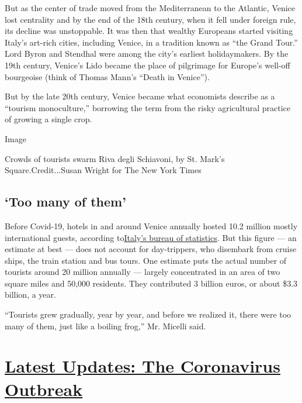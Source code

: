 But as the center of trade moved from the Mediterranean to the Atlantic,
Venice lost centrality and by the end of the 18th century, when it fell
under foreign rule, its decline was unstoppable. It was then that
wealthy Europeans started visiting Italy's art-rich cities, including
Venice, in a tradition known as ``the Grand Tour.'' Lord Byron and
Stendhal were among the city's earliest holidaymakers. By the 19th
century, Venice's Lido became the place of pilgrimage for Europe's
well-off bourgeoise (think of Thomas Mann's ``Death in Venice'').

But by the late 20th century, Venice became what economists describe as
a ``tourism monoculture,'' borrowing the term from the risky
agricultural practice of growing a single crop.

Image

Crowds of tourists swarm Riva degli Schiavoni, by St. Mark's
Square.Credit...Susan Wright for The New York Times

\hypertarget{too-many-of-them}{%
\subsection{`Too many of them'}\label{too-many-of-them}}

Before Covid-19, hotels in and around Venice annually hosted 10.2
million mostly international guests, according
to\href{https://www.istat.it/it/files/2019/11/Movimento-turistico-in-Italia-2018.pdf}{Italy's
bureau of statistics}. But this figure --- an estimate at best --- does
not account for day-trippers, who disembark from cruise ships, the train
station and bus tours. One estimate puts the actual number of tourists
around 20 million annually --- largely concentrated in an area of two
square miles and 50,000 residents. They contributed 3 billion euros, or
about \$3.3 billion, a year.

``Tourists grew gradually, year by year, and before we realized it,
there were too many of them, just like a boiling frog,'' Mr. Micelli
said.

\hypertarget{latest-updates-the-coronavirus-outbreak}{%
\section{\texorpdfstring{\href{https://www.nytimes3xbfgragh.onion/2020/08/21/world/covid-19-coronavirus.html?action=click\&pgtype=Article\&state=default\&region=MAIN_CONTENT_1\&context=storylines_live_updates}{Latest
Updates: The Coronavirus
Outbreak}}{Latest Updates: The Coronavirus Outbreak}}\label{latest-updates-the-coronavirus-outbreak}}

